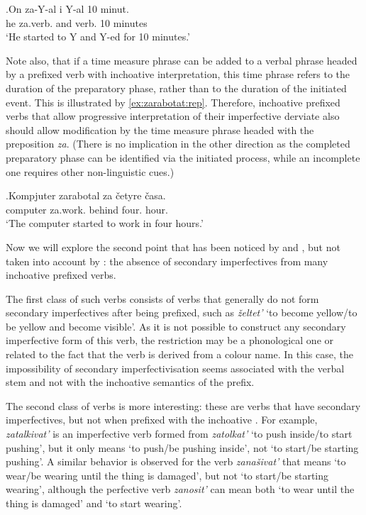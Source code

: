 \exg.\label{context:za:inch}On za-Y-al i Y-al 10 minut.\\
he za.verb. and verb. 10 minutes\\
\trans `He started to Y and Y-ed for 10 minutes.'

Note also, that if a time measure phrase can be added to a verbal phrase headed by a prefixed verb with inchoative interpretation, this time phrase refers to the duration of the preparatory phase, rather than to the duration of the initiated event. This is illustrated by \ref{ex:zarabotat:rep}. Therefore, inchoative prefixed verbs that allow progressive interpretation of their imperfective derviate also should allow modification by the time measure phrase headed with the preposition \textit{za}. (There is no implication in the other direction as the completed preparatory phase can be identified via the initiated process, while an incomplete one requires other non-linguistic cues.)

\exg.\label{ex:zarabotat:rep}Kompjuter zarabotal za \v{c}etyre \v{c}asa.\\
computer za.work. behind four. hour.\\
\trans `The computer started to work in four hours.'

Now we will explore the second point that has been noticed by \citet{Svenonius:04b} and \citet{Braginsky:08}, but not taken into account by \citet{Tatevosov:09}: the absence of secondary imperfectives from many inchoative prefixed verbs. 

The first class of such verbs consists of verbs that generally do not form secondary imperfectives after being prefixed, such as \textit{\v{z}eltet'} `to become yellow/to be yellow and become visible'. As it is not possible to construct any secondary imperfective form of this verb, the restriction may be a phonological one or related to the fact that the verb is derived from a colour name. In this case, the impossibility of secondary imperfectivisation seems associated with the verbal stem and not with the inchoative semantics of the prefix. 

The second class of verbs is more interesting: these are verbs that have secondary imperfectives, but not when prefixed with the inchoative . For example, \textit{zatalkivat'} is an imperfective verb formed from \textit{zatolkat'} `to push inside/to start pushing', but it only means `to push/be pushing inside', not `to start/be starting pushing'. A similar behavior is observed for the verb \textit{zana\v{s}ivat'} that means `to wear/be wearing until the thing is damaged', but not `to start/be starting wearing', although the perfective verb \textit{zanosit'} can mean both `to wear until the thing is damaged' and `to start wearing'.

